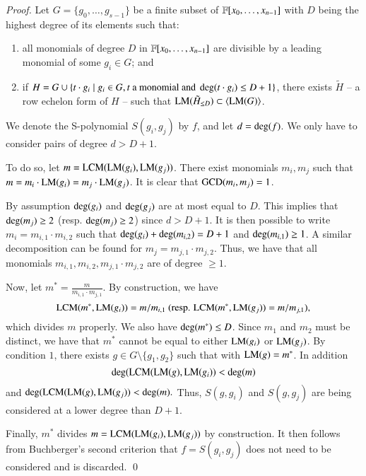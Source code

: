 \begin{proof}
Let $G=\{g_0,\ldots, g_{s-1}\}$ be a finite subset of ${{{\mathbb F}}[x_0,\ldots,x_{n-1}]}$ with $D$ being the highest degree of its elements such that: 
\begin{enumerate}
 \item all monomials of degree $D$ in ${{{\mathbb F}}[x_0,\ldots,x_{n-1}]}$ are divisible by a leading monomial of some $g_i \in G$; and
 \item if $H = G \cup \{t \cdot g_i \mid g_i \in G, t \textnormal{ a monomial and } \deg(t \cdot g_i) \leq D + 1\}$, there exists $\tilde{H}$ -- a row echelon form of $H$ -- such that $\textsc{LM}(\tilde{H}_{\leq D}) \subset \langle \textsc{LM}(G)\rangle$.
\end{enumerate}
We denote the S-polynomial $S(g_i,g_j)$ by $f$, and let $d={\rm deg}(f)$. We only have to consider pairs of degree $d>D+1$. 

To do so, let $m=\textsc{LCM}(\textsc{LM}(g_i), \textsc{LM}(g_j))$. There exist monomials $m_i, m_j$ such that $m = m_i \cdot \textsc{LM}(g_i) = m_j \cdot \textsc{LM}(g_j)$. 
It is clear that $\textsc{GCD}(m_i,m_j) = 1$.

By assumption ${\rm deg}(g_i)$ and ${\rm deg}(g_j)$ are at most equal to $D$. This implies that ${\rm deg}(m_j) \geq 2$ (resp. ${\rm deg}(m_j) \geq 2$)
since $d>D+1$. It is then possible to write $m_i=m_{i,1}\cdot m_{i,2}$ such that  ${\rm deg}(g_i) +{\rm deg}(m_{i,2})=D+1$ 
and  ${\rm deg}(m_{i,1}) \geq 1$.
A similar decomposition can be found for $m_j=m_{j,1}\cdot m_{j,2}$.         
Thus, we have that all monomials $m_{i,1}, m_{i,2}, m_{j,1}\cdot m_{j,2}$ are of degree $\geq 1$. 

Now, let $m^*= \frac{m}{m_{i,1}\cdot m_{j,1}}$. By construction, we have $$\textsc{LCM}(m^*, \textsc{LM}(g_i))=m/m_{i,1} \textnormal{ (resp. } \textsc{LCM}(m^*, \textsc{LM}(g_j))=m/m_{j,1}\textnormal{)},$$ which divides $m$ properly.  
We also have ${\rm deg}(m^*) \leq D$. Since $m_1$ and $m_2$ must be distinct, we have that $m^*$ cannot be equal to either $\textsc{LM}(g_i)$ or $\textsc{LM}(g_j)$. By condition $1$, there exists $g \in G \setminus \{g_1, g_2 \}$ such that  with $\textsc{LM}(g)= m^*$.  In addition $$\deg(\textsc{LCM}(\textsc{LM}(g), \textsc{LM}(g_i)) < \deg(m)$$ and $\deg(\textsc{LCM}(\textsc{LM}(g), \textsc{LM}(g_j)) < \deg(m).$ Thus, $S(g,g_i)$ and $S(g,g_j)$ are being considered at a lower degree than $D+1$.

Finally, $m^*$ divides $m=\textsc{LCM}(\textsc{LM}(g_i), \textsc{LM}(g_j))$ by construction. It then follows from Buchberger's second criterion  that $f=S(g_i,g_j)$ does not need to be considered and is discarded.
\qed
\end{proof}
